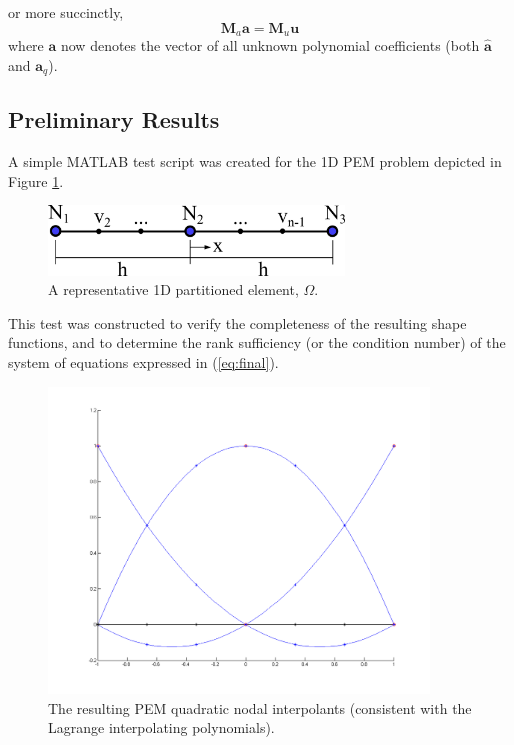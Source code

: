 \documentclass[12pt]{article}
\begin{document}
or more succinctly,
\begin{equation}
	\mathbf{M}_a \mathbf{a} = \mathbf{M}_u \mathbf{u}
	\label{eq:final}
\end{equation}
where $\mathbf{a}$ now denotes the vector of all unknown polynomial coefficients (both $\hat{\mathbf{a}}$ and $\mathbf{a}_q$).

\newpage

\subsection*{Preliminary Results}

A simple MATLAB test script was created for the 1D PEM problem depicted in Figure \ref{fig:1dpem}.
\begin{figure}[!h]
  \centering
  \includegraphics[width=0.7\textwidth]{1dpem.png}
  \caption{A representative 1D partitioned element, $\Omega$.}
  \label{fig:1dpem}
\end{figure}
This test was constructed to verify the completeness of the resulting shape functions, and to determine the rank sufficiency (or the condition number) of the system of equations expressed in (\ref{eq:final}).

\begin{figure}[!ht]
  \centering
  \includegraphics[width=0.9\textwidth]{lagrange.png}
  \caption{The resulting PEM quadratic nodal interpolants (consistent with the Lagrange interpolating polynomials).}
  \label{fig:lagrange}
\end{figure}
\end{document}
